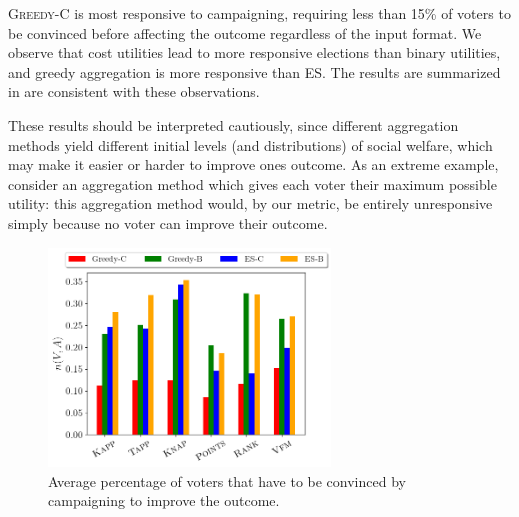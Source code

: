 \documentclass[mnsc,blindrev]{informs3_freeuse} %
\newcommand{\mes}{ES}
\newcommand{\costgreedy}{\textsc{Greedy-C}}
\begin{document}
\costgreedy{} is  most responsive to campaigning, requiring less than 15\% of voters to be convinced before affecting the outcome regardless of the input format. 
We observe   that cost utilities lead to more responsive elections than binary utilities, and greedy aggregation is more responsive than \mes{}. The results are summarized in  are consistent with these observations. 

These results should be interpreted cautiously, since different aggregation methods yield different initial levels (and distributions) of social welfare, which may make it easier or harder to improve ones outcome. As an extreme example, consider an aggregation method which gives each voter their maximum possible utility: this aggregation method would, by our metric,  be entirely unresponsive simply because no voter can improve their outcome. 

\begin{figure}[htb]
\begin{center}
\includegraphics[width=7.5cm]{../experiment/avg_first_percentage.png}
\caption{Average percentage of voters that have to be convinced by campaigning to improve the outcome.  
}\label{fig:responsiveness}
\end{center}
\vspace{-3mm}
\end{figure}





\end{document}
